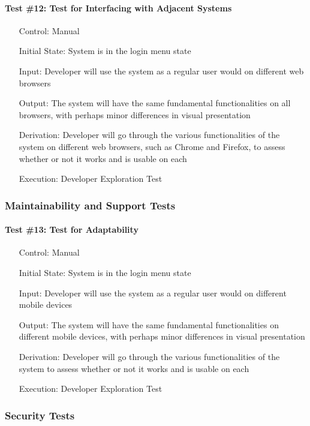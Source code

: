 \documentclass[12pt, titlepage]{article}
\begin{document}
\paragraph*{Test \#12: Test for Interfacing with Adjacent Systems}
\begin{itemize}
	\item[Control:] Manual
	\item[Initial State:] System is in the login menu state
	\item[Input:] Developer will use the system as a regular user would on different web browsers
	\item[Output:] The system will have the same fundamental functionalities on all browsers, with perhaps minor differences in visual presentation
	\item[Derivation:] Developer will go through the various functionalities of the system on different web browsers, such as Chrome and Firefox, to assess whether or not it works and is usable on each
	\item[Execution:] Developer Exploration Test
\end{itemize}

\subsubsection{Maintainability and Support Tests}

\paragraph*{Test \#13: Test for Adaptability}
\begin{itemize}
	\item[Control:] Manual
	\item[Initial State:] System is in the login menu state
	\item[Input:] Developer will use the system as a regular user would on different mobile devices
	\item[Output:] The system will have the same fundamental functionalities on different mobile devices, with perhaps minor differences in visual presentation
	\item[Derivation:] Developer will go through the various functionalities of the system to assess whether or not it works and is usable on each
	\item[Execution:] Developer Exploration Test
\end{itemize}

\subsubsection{Security Tests}
\end{document}
